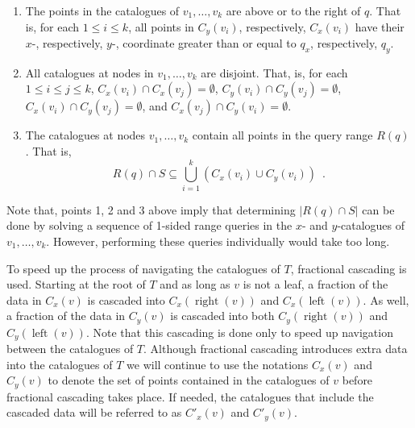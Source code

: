 \documentclass{patmorin}
\DeclareMathOperator{\lft}{left}
\DeclareMathOperator{\rght}{right}
\begin{document}
\begin{enumerate}

\item The points in the catalogues of $v_1,\ldots,v_k$ are above or to
the right of $q$.  That is, for each $1\le i \le k$, all points in
$C_y(v_i)$, respectively, $C_x(v_i)$ have their $x$-, respectively,
$y$-, coordinate greater than or equal to $q_x$, respectively, $q_y$.

\item All catalogues at nodes in $v_1,\ldots,v_k$ are disjoint.  That,
is, for each $1\le i\le j \le k$,
$C_x(v_i)\cap C_x(v_j) = \emptyset$,
$C_y(v_i)\cap C_y(v_j) = \emptyset$,
$C_x(v_i)\cap C_y(v_j) = \emptyset$, and
$C_x(v_j)\cap C_y(v_i) = \emptyset$.

\item The catalogues at nodes $v_1,\ldots,v_k$ contain all points in
the query range $R(q)$.  That is,
\[
     R(q)\cap S \subseteq \bigcup_{i=1}^k \left(C_x(v_i)\cup C_y(v_i)\right)
        \enspace . 
\]
\end{enumerate}

Note that, points 1, 2 and 3 above imply that determining $|R(q)\cap
S|$ can be done by solving a sequence of 1-sided range queries in the
$x$- and $y$-catalogues of $v_1,\ldots,v_k$.  However, performing these queries
individually would take too long.

To speed up the process of navigating the catalogues of $T$,
fractional cascading \cite{ae76} is used.  Starting at the root of $T$ and as long as $v$ is
not a leaf, a fraction of the data in $C_x(v)$ is cascaded into
$C_x(\rght(v))$ and $C_x(\lft(v))$.  As well, a fraction of the data
in $C_y(v)$ is cascaded into both $C_y(\rght(v))$ and $C_y(\lft(v))$.
%
%
%
%
%
Note that this
cascading is done only to speed up navigation between the catalogues
of $T$.  Although fractional cascading introduces extra data into the
catalogues of $T$ we will continue to use the notations $C_x(v)$ and
$C_y(v)$ to denote the set of points contained in the catalogues of
$v$ before fractional cascading takes place.  If needed, the catalogues
that include the cascaded data will be referred to as $C'_x(v)$ and
$C'_y(v)$.
\end{document}
